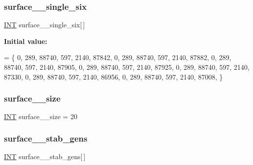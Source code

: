 \subsubsection{\texorpdfstring{surface\+\_\+\_\+single\+\_\+six}{surface\_17\_single\_six}}
{\footnotesize\ttfamily \mbox{\hyperlink{galois_8h_a09fddde158a3a20bd2dcadb609de11dc}{I\+NT}} surface\+\_\+\_\+single\+\_\+six\mbox{[}$\,$\mbox{]}}

{\bfseries Initial value\+:}
\begin{DoxyCode}
= \{ 
    0, 289, 88740, 597, 2140, 87842, 
    0, 289, 88740, 597, 2140, 87882, 
    0, 289, 88740, 597, 2140, 87905, 
    0, 289, 88740, 597, 2140, 87925, 
    0, 289, 88740, 597, 2140, 87330, 
    0, 289, 88740, 597, 2140, 86956, 
    0, 289, 88740, 597, 2140, 87008, 
\}
\end{DoxyCode}
\mbox{\label{surface__17_8_c_a57b30432c4172b3ed1f21e8a8bd1e16c}} 
\subsubsection{\texorpdfstring{surface\+\_\+\_\+size}{surface\_17\_size}}
{\footnotesize\ttfamily \mbox{\hyperlink{galois_8h_a09fddde158a3a20bd2dcadb609de11dc}{I\+NT}} surface\+\_\+\_\+size = 20}

\mbox{\label{surface__17_8_c_a31fc6b1012228f586151dfdbf93aa4e3}} 
\subsubsection{\texorpdfstring{surface\+\_\+\_\+stab\+\_\+gens}{surface\_17\_stab\_gens}}
{\footnotesize\ttfamily \mbox{\hyperlink{galois_8h_a09fddde158a3a20bd2dcadb609de11dc}{I\+NT}} surface\+\_\+\_\+stab\+\_\+gens\mbox{[}$\,$\mbox{]}}

